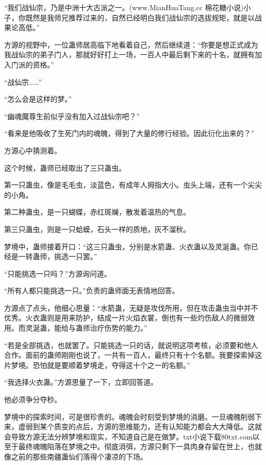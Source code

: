 
\begin{this_body}

“我们战仙宗，乃是中洲十大古派之一。(www.MianHuaTang.cc 棉花糖小说)小子，你既然是我师兄推荐过来的，自然已经明白我们战仙宗的选拔规矩，就是以战果论高低。”

方源的视野中，一位蛊师居高临下地看着自己，然后继续道：“你要是想正式成为我战仙宗的弟子门人，那就好好打上一场，一百人中最后剩下来的十名，就拥有加入门派的资格。”

“战仙宗……”

“怎么会是这样的梦。”

“幽魂魔尊生前似乎没有加入过战仙宗吧？”

“看来是他吸收了生死门内的魂魄，得到了大量的修行经验。因此衍化出来的？”

方源心中猜测着。

这个时候，蛊师已经取出了三只蛊虫。

第一只蛊虫，像是毛毛虫，淡蓝色，有成年人拇指大小。虫头上端，还有一个尖尖的小角。

第二种蛊虫，是一只蝴蝶，赤红斑斓，散发着温热的气息。

第三只蛊虫，则是一只蛤蟆，石头一样的质地，灰不溜秋。

梦境中，蛊师接着开口：“这三只蛊虫，分别是水箭蛊、火衣蛊以及灵涎蛊。你已经是一转蛊师，挑选一只罢。”

“只能挑选一只吗？”方源询问道。

“所有人都只能挑选一只。”负责的蛊师面无表情地回答。

方源点了点头，他细心思量：“水箭蛊，无疑是攻伐所用，但在攻击蛊虫当中并不优秀。火衣蛊则是用来防护，结成一片火焰衣裳，倒也有一些灼伤敌人的微弱效用。而灵涎蛊，能给与蛊师治疗伤势的能力。”

“若是全部挑选，也就罢了。只能挑选一只的话，就说明这项考核，必须要和他人合作。面前的蛊师刚刚也说了，一共有一百人，最终只有十个名额。我要探索掉这片梦境。恐怕就是要顺着梦境走，夺得这十个之一的名额。”

“我选择火衣蛊。”方源思量了一下，立即回答道。

他必须争分夺秒。

梦境中的探索时间，可是很珍贵的。魂魄会时刻受到梦境的消磨。一旦魂魄削弱下来，虚弱到某个质变的点后，方源的思维能力，还有认知能力都会大大降低。这就会导致方源无法分辨梦境和现实，不知道自己是在做梦。txt小说下载80txt.com以至于最终魂魄陷落在梦境之中。彻底消弭，方源只剩下一具肉身存留在世上，也就像之前的那些南疆蛊仙们落得个凄凉的下场。


\end{this_body}
